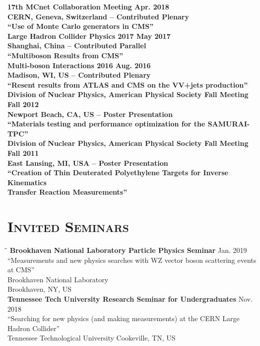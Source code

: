 \documentclass[10pt]{res} %
\begin{document}
\begin{resume}
\begin{tabbing}
\bf{17th MCnet Collaboration Meeting} 		 \> \>	    Apr. 2018 \\
CERN, Geneva, Switzerland -- Contributed Plenary\\
``Use of Monte Carlo generators in CMS'' \\
\bf{Large Hadron Collider Physics 2017} 		 \> \>	    May 2017 \\
Shanghai, China -- Contributed Parallel \\
``Multiboson Results from CMS'' \\
\bf{Multi-boson Interactions 2016} 		 \> \>	    Aug. 2016 \\
Madison, WI, US -- Contributed Plenary \\
``Resent results from ATLAS and CMS on the VV+jets production'' \\
\bf{Division of Nuclear Physics, American Physical Society Fall Meeting} 		 \> \>	    Fall 2012 \\
Newport Beach, CA, US -- Poster Presentation\\
``Materials testing and performance optimization for the SAMURAI-TPC'' \\
\bf{Division of Nuclear Physics, American Physical Society Fall Meeting} 		 \> \>	    Fall 2011 \\
East Lansing, MI, USA -- Poster Presentation\\ 
``Creation of Thin Deuterated Polyethylene Targets for Inverse Kinematics \\Transfer Reaction Measurements'' \\
\end{tabbing}\vspace{-20pt}      %

\section{\textsc{Invited Seminars}}
\vspace{-0.1in}
\begin{tabbing}
\hspace{2.3in}\= \hspace{2.6in}\= \kill %
\textbf{Brookhaven National Laboratory Particle Physics Seminar} \>\> Jan. 2019\\ 
``Measurements and new physics searches with WZ vector boson scattering events at CMS'' \\
Brookhaven National Laboratory \\
Brookhaven, NY, US \\
\textbf{Tennessee Tech University Research Seminar for Undergraduates} \>\> Nov. 2018\\ 
``Searching for new physics (and making measurements) at the CERN Large Hadron Collider'' \\
Tennessee Technological University
Cookeville, TN, US \\
\end{tabbing}\vspace{-20pt}      %


\end{resume}
\end{document}
